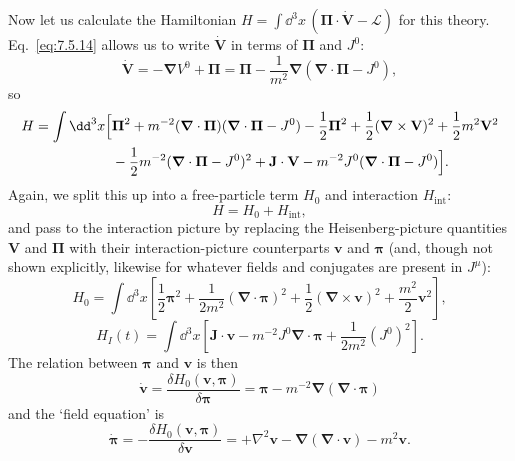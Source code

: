 Now let us calculate the Hamiltonian
$H=\int \dd^3x\,(\boldsymbol\Pi\cdot\dot{\mathbf V}-\mathcal L)$ for this
theory. Eq.~\eqref{eq:7.5.14} allows us to write $\dot{\mathbf V}$ in terms of
$\boldsymbol\Pi$ and $J^0$:
\[
\dot{\mathbf V}=-\boldsymbol\nabla V^0+\boldsymbol\Pi
=\boldsymbol\Pi-\frac1{m^2}\boldsymbol\nabla
(\boldsymbol\nabla\cdot\boldsymbol\Pi-J^0),
\]
so
\begin{align*}
H=\int \dd^3x\Bigl[&\boldsymbol\Pi^2
+m^{-2}(\boldsymbol\nabla\cdot\boldsymbol\Pi)
(\boldsymbol\nabla\cdot\boldsymbol\Pi-J^0)
-\frac12\boldsymbol\Pi^2+\frac12(\boldsymbol\nabla\times\mathbf V)^2
+\frac12m^2\mathbf V^2\notag\\
&-\frac12m^{-2}(\boldsymbol\nabla\cdot\boldsymbol\Pi-J^0)^2
+\mathbf J\cdot\mathbf V
-m^{-2}J^0(\boldsymbol\nabla\cdot\boldsymbol\Pi-J^0)\Bigr].
\end{align*}
Again, we split this up into a free-particle term $H_0$ and interaction
$H_{\mathrm{int}}$:
\begin{equation}
H=H_0+H_{\mathrm{int}},
\tag{7.5.17}\label{eq:7.5.17}
\end{equation}
and pass to the interaction picture by replacing the Heisenberg-picture
quantities $\mathbf V$ and $\boldsymbol\Pi$ with their interaction-picture
counterparts $\mathbf v$ and $\boldsymbol\pi$ (and, though not shown
explicitly, likewise for whatever fields and conjugates are present in
$J^\mu$):
\begin{equation}
H_0=\int \dd^3x\left[\frac12\boldsymbol\pi^2
+\frac1{2m^2}(\boldsymbol\nabla\cdot\boldsymbol\pi)^2
+\frac12(\boldsymbol\nabla\times\mathbf v)^2
+\frac{m^2}{2}\mathbf v^2\right],
\tag{7.5.18}\label{eq:7.5.18}
\end{equation}
\begin{equation}
H_I(t)=\int \dd^3x\left[\mathbf J\cdot\mathbf v
-m^{-2}J^0\boldsymbol\nabla\cdot\boldsymbol\pi
+\frac1{2m^2}(J^0)^2\right].
\tag{7.5.19}\label{eq:7.5.19}
\end{equation}
The relation between $\boldsymbol\pi$ and $\mathbf v$ is then
\begin{equation}
\dot{\mathbf v}=\frac{\delta H_0(\mathbf v,\boldsymbol\pi)}
{\delta\boldsymbol\pi}
=\boldsymbol\pi-m^{-2}\boldsymbol\nabla
(\boldsymbol\nabla\cdot\boldsymbol\pi)
\tag{7.5.20}\label{eq:7.5.20}
\end{equation}
and the `field equation' is
\begin{equation}
\dot{\boldsymbol\pi}=-\frac{\delta H_0(\mathbf v,\boldsymbol\pi)}
{\delta\mathbf v}
=+\nabla^2\mathbf v-\boldsymbol\nabla(\boldsymbol\nabla\cdot\mathbf v)
-m^2\mathbf v.
\tag{7.5.21}\label{eq:7.5.21}
\end{equation}
